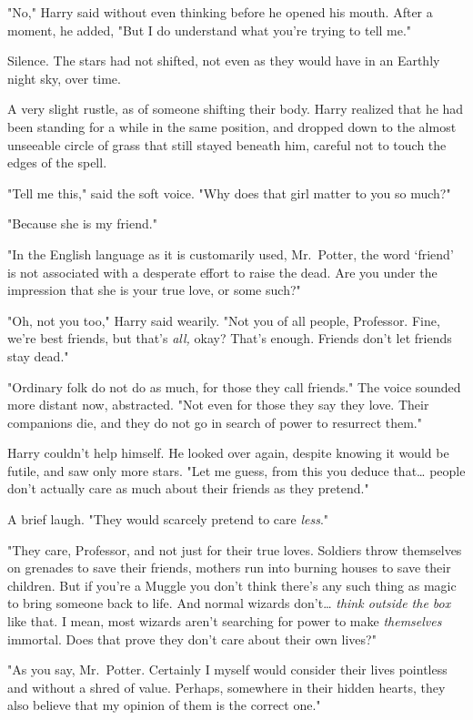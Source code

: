 "No," Harry said without even thinking before he opened his mouth. After a 
moment, he added, "But I do understand what you're trying to tell me."

Silence. The stars had not shifted, not even as they would have in an Earthly 
night sky, over time.

A very slight rustle, as of someone shifting their body. Harry realized that he 
had been standing for a while in the same position, and dropped down to the 
almost unseeable circle of grass that still stayed beneath him, careful not to 
touch the edges of the spell.

"Tell me this," said the soft voice. "Why does that girl matter to you so much?"

"Because she is my friend."

"In the English language as it is customarily used, Mr.~Potter, the word 
`friend' is not associated with a desperate effort to raise the dead. Are you 
under the impression that she is your true love, or some such?"

"Oh, not you too," Harry said wearily. "Not you of all people, Professor. Fine, 
we're best friends, but that's \emph{all,} okay? That's enough. Friends don't 
let friends stay dead."

"Ordinary folk do not do as much, for those they call friends." The voice 
sounded more distant now, abstracted. "Not even for those they say they love. 
Their companions die, and they do not go in search of power to resurrect them."

Harry couldn't help himself. He looked over again, despite knowing it would be 
futile, and saw only more stars. "Let me guess, from this you deduce 
that{\ldots} people don't actually care as much about their friends as they 
pretend."

A brief laugh. "They would scarcely pretend to care \emph{less}."

"They care, Professor, and not just for their true loves. Soldiers throw 
themselves on grenades to save their friends, mothers run into burning houses 
to save their children. But if you're a Muggle you don't think there's any such 
thing as magic to bring someone back to life. And normal wizards don't{\ldots} 
\emph{think outside the box} like that. I mean, most wizards aren't searching 
for power to make \emph{themselves} immortal. Does that prove they don't care 
about their own lives?"

"As you say, Mr.~Potter. Certainly I myself would consider their lives 
pointless and without a shred of value. Perhaps, somewhere in their hidden 
hearts, they also believe that my opinion of them is the correct one."

